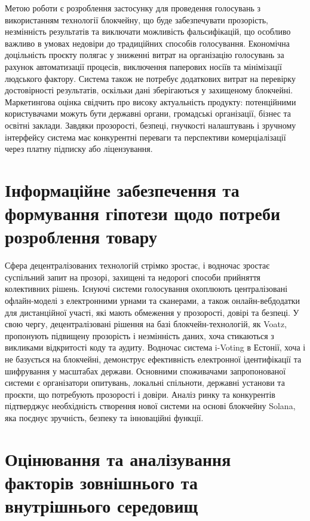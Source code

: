\documentclass[14pt]{extreport}
\begin{document}
  Метою роботи є розроблення застосунку для проведення голосувань з використанням технології блокчейну, що буде забезпечувати прозорість, незмінність результатів та виключати можливість фальсифікацій, що особливо важливо в умовах недовіри до традиційних способів голосування. Економічна доцільність проєкту полягає у зниженні витрат на організацію голосувань за рахунок автоматизації процесів, виключення паперових носіїв та мінімізації людського фактору. Система також не потребує додаткових витрат на перевірку достовірності результатів, оскільки дані зберігаються у захищеному блокчейні. Маркетингова оцінка свідчить про високу актуальність продукту: потенційними користувачами можуть бути державні органи, громадські організації, бізнес та освітні заклади. Завдяки прозорості, безпеці, гнучкості налаштувань і зручному інтерфейсу система має конкурентні переваги та перспективи комерціалізації через платну підписку або ліцензування.
  
  \section{Інформаційне забезпечення та формування гіпотези щодо потреби розроблення товару}
  
  Сфера децентралізованих технологій стрімко зростає, і водночас зростає суспільний запит на прозорі, захищені та недорогі способи прийняття колективних рішень. Існуючі системи голосування охоплюють централізовані офлайн-моделі з електронними урнами та сканерами, а також онлайн-вебдодатки для дистанційної участі, які мають обмеження у прозорості, довірі та безпеці. У свою чергу, децентралізовані рішення на базі блокчейн-технологій, як Voatz, пропонують підвищену прозорість і незмінність даних, хоча стикаються з викликами відкритості коду та аудиту. Водночас система i-Voting в Естонії, хоча і не базується на блокчейні, демонструє ефективність електронної ідентифікації та шифрування у масштабах держави. Основними споживачами запропонованої системи є організатори опитувань, локальні спільноти, державні установи та проєкти, що потребують прозорості і довіри. Аналіз ринку та конкурентів підтверджує необхідність створення нової системи на основі блокчейну Solana, яка поєднує зручність, безпеку та інноваційні функції.
  
  \section{Оцінювання та аналізування факторів зовнішнього та внутрішнього середовищ}
  
\end{document}
